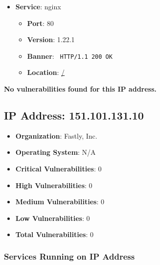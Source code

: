 \documentclass{article}
\begin{document}
\begin{itemize}
    
        \item \textbf{Service}: nginx
        \begin{itemize}
            \item \textbf{Port}: 80
            \item \textbf{Version}:  1.22.1 
            \item \textbf{Banner}: \texttt{
                HTTP/1.1 200 OK
            }
            \item \textbf{Location}: \href{ / }{ / }
        \end{itemize}
    
\end{itemize}


\textbf{No vulnerabilities found for this IP address.}




\clearpage



\subsection*{IP Address: 151.101.131.10}

\begin{itemize}
    \item \textbf{Organization}: Fastly, Inc.
    \item \textbf{Operating System}:  N/A 
    \item \textbf{Critical Vulnerabilities}: 0
    \item \textbf{High Vulnerabilities}: 0
    \item \textbf{Medium Vulnerabilities}: 0
    \item \textbf{Low Vulnerabilities}: 0
    \item \textbf{Total Vulnerabilities}: 0
\end{itemize}

\subsubsection*{Services Running on IP Address}
\end{document}
